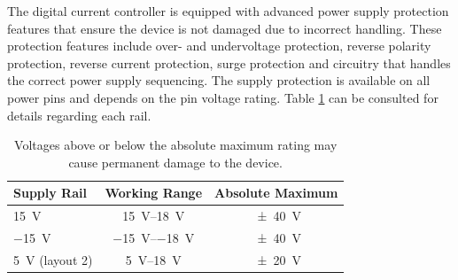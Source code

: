 The digital current controller is equipped with advanced power supply protection features that ensure the device is not damaged due to incorrect handling. These protection features include over- and undervoltage protection, reverse polarity protection, reverse current protection, surge protection and circuitry that handles the correct power supply sequencing. The supply protection is available on all power pins and depends on the pin voltage rating. Table \ref{tab:jumper_power_supply_ratings} can be consulted for details regarding each rail.

\begin{table}[ht]
    \centering
    \begin{tabular}{lcc}
        \toprule
        Supply Rail& Working Range& Absolute Maximum \\
        \midrule
        \qty{+15}{\V}& \qtyrange[range-phrase=\textup{~to~}]{15}{18}{\V}& \qty{\pm 40}{\V} \\
        \qty{-15}{\V}& \qtyrange[range-phrase=\textup{~to~}]{-15}{-18}{\V}& \qty{\pm 40}{\V} \\
        \qty{+5}{\V} (layout 2)& \qtyrange[range-phrase=\textup{~to~}]{5}{18}{\V}& \qty{\pm 20}{\V} \\
        \bottomrule
    \end{tabular}
    \caption{Voltages above or below the absolute maximum rating may cause permanent damage to the device.}
    \label{tab:jumper_power_supply_ratings}
\end{table}

